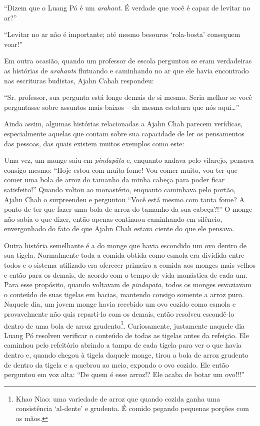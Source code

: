``Dizem que o Luang Pó é um \emph{arahant}. É verdade que você é capaz
de levitar no ar?''

``Levitar no ar não é importante; até mesmo besouros `rola-bosta'
conseguem voar!''

Em outra ocasião, quando um professor de escola perguntou se eram
verdadeiras as histórias de \emph{arahants} flutuando e caminhando no ar
que ele havia encontrado nas escrituras budistas, Ajahn Cahah respondeu:

``Sr. professor, sua pergunta está longe demais de si mesmo. Seria
melhor se você perguntasse sobre assuntos mais baixos -- da mesma
estatura que nós aqui\ldots{}''

Ainda assim, algumas histórias relacionadas a Ajahn Chah parecem
verídicas, especialmente aquelas que contam sobre sua capacidade de ler
os pensamentos das pessoas, das quais existem muitos exemplos como este:

Uma vez, um monge saiu em \emph{pindapāta} e, enquanto andava pelo
vilarejo, pensava consigo mesmo: ``Hoje estou com muita fome! Vou comer
muito, vou ter que comer uma bola de arroz do tamanho da minha cabeça
para poder ficar satisfeito!'' Quando voltou ao monastério, enquanto
caminhava pelo portão, Ajahn Chah o surpreendeu e perguntou ``Você está
mesmo com tanta fome? A ponto de ter que fazer uma bola de arroz do
tamanho da sua cabeça?!'' O monge não sabia o que dizer, então apenas
continuou caminhando em silêncio, envergonhado do fato de que Ajahn Chah
estava ciente do que ele pensava.

Outra história semelhante é a do monge que havia escondido um ovo dentro
de sua tigela. Normalmente toda a comida obtida como esmola era dividida
entre todos e o sistema utilizado era oferecer primeiro a comida aos
monges mais velhos e então para os demais, de acordo com o tempo de vida
monástica de cada um. Para esse propósito, quando voltavam de
\emph{pindapāta}, todos os monges esvaziavam o conteúdo de suas tigelas
em bacias, mantendo consigo somente a arroz puro. Naquele dia, um jovem
monge havia recebido um ovo cozido como esmola e provavelmente não quis
reparti-lo com os demais, então resolveu escondê-lo dentro de uma bola
de arroz grudento\footnote{Khao Niao: uma variedade de arroz que quando
  cozida ganha uma consistência `al-dente' e grudenta. É comido pegando
  pequenas porções com as mãos.}. Curiosamente, justamente naquele dia
Luang Pó resolveu verificar o conteúdo de todas as tigelas antes da
refeição. Ele caminhou pelo refeitório abrindo a tampa de cada tigela
para ver o que havia dentro e, quando chegou à tigela daquele monge,
tirou a bola de arroz grudento de dentro da tigela e a quebrou ao meio,
expondo o ovo cozido. Ele então perguntou em voz alta: ``De quem é esse
arroz!? Ele acaba de botar um ovo!!!''

